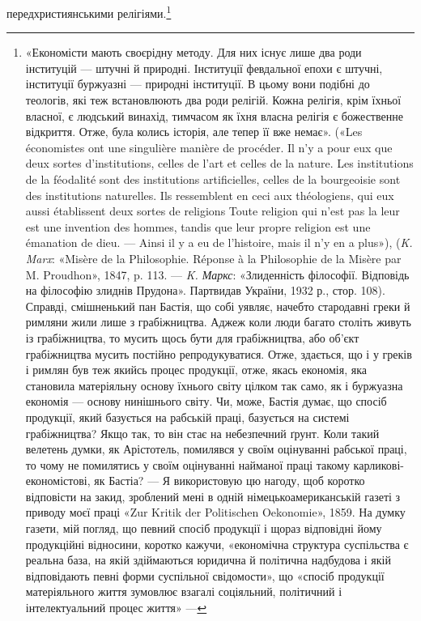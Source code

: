 передхристиянськими релігіями.\footnote{
«Економісти мають своєрідну методу. Для них існує лише два
роди інституцій — штучні й природні. Інституції февдальної епохи є
штучні, інституції буржуазні — природні інституції. В цьому вони
подібні до теологів, які теж встановлюють два роди релігій. Кожна релігія,
крім їхньої власної, є людський винахід, тимчасом як їхня власна
релігія є божественне відкриття. Отже, була колись історія, але тепер
її вже немає». («Les économistes ont une singulière manière de procéder.
Il n’y a pour eux que deux sortes d’institutions, celles de l’art et celles de
la nature. Les institutions de la féodalité sont des institutions artificielles,
celles de la bourgeoisie sont des institutions naturelles. Ils ressemblent
en ceci aux théologiens, qui eux aussi établissent deux sortes de religions
Toute religion qui n’est pas la leur est une invention des hommes, tandis
que leur propre religion est une émanation de dieu. — Ainsi il y a eu de
l’histoire, mais il n’y en a plus»), (\emph{K. Marx}: «Misère de la Philosophie.
Réponse à la Philosophie de la Misère par M. Proudhon», 1847, p. 113. —
\emph{K. Маркс}: «Злиденність філософії. Відповідь на філософію злиднів
Прудона». Партвидав України, 1932 р., стор. 108). Справді, смішненький
пан Бастія, що собі уявляє, начебто стародавні греки й римляни жили
лише з грабіжництва. Аджеж коли люди багато століть живуть із грабіжництва,
то мусить щось бути для грабіжництва, або об’єкт грабіжництва
мусить постійно репродукуватися. Отже, здається, що і у греків і
римлян був теж якийсь процес продукції, отже, якась економія, яка
становила матеріяльну основу їхнього світу цілком так само, як і буржуазна
економія — основу нинішнього світу. Чи, може, Бастія думає,
що спосіб продукції, який базується на рабській праці, базується на системі
грабіжництва? Якщо так, то він стає на небезпечний ґрунт. Коли
такий велетень думки, як Арістотель, помилявся у своїм оцінуванні рабської
праці, то чому не помилятись у своїм оцінуванні найманої праці
такому карликові-економістові, як Бастіа? — Я використовую цю нагоду,
щоб коротко відповісти на закид, зроблений мені в одній німецькоамериканській
газеті з приводу моєї праці «Zur Kritik der Politischen
Oekonomie», 1859. На думку газети, мій погляд, що певний спосіб продукції
і щораз відповідні йому продукційні відносини, коротко кажучи,
«економічна структура суспільства є реальна база, на якій здіймаються
юридична й політична надбудова і якій відповідають певні форми
суспільної свідомости», що «спосіб продукції матеріяльного життя зумовлює
взагалі соціяльний, політичний і інтелектуальний процес життя» —
}
